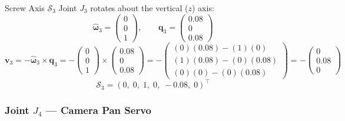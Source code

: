 \documentclass[12pt,a4paper]{article}
\newcommand{\vect}[1]{\bm{#1}}
\begin{document}
\begin{mathbox}{Screw Axis $\mathcal{S}_3$}
Joint $J_3$ rotates about the vertical ($z$) axis:
\[
  \vect{\hat\omega}_3 = \begin{pmatrix}0\\0\\1\end{pmatrix}, \qquad
  \vect{q}_3 = \begin{pmatrix}0.08\\0\\0.08\end{pmatrix}
\]
\[
  \vect{v}_3
  = -\vect{\hat\omega}_3 \times \vect{q}_3
  = -\begin{pmatrix}0\\0\\1\end{pmatrix} \times \begin{pmatrix}0.08\\0\\0.08\end{pmatrix}
  = -\begin{pmatrix}(0)(0.08)-(1)(0)\\(1)(0.08)-(0)(0.08)\\(0)(0)-(0)(0.08)\end{pmatrix}
  = -\begin{pmatrix}0\\0.08\\0\end{pmatrix}
\]
\[
  \boxed{\mathcal{S}_3 = (0,\;0,\;1,\;0,\;-0.08,\;0)^\top}
\]
\end{mathbox}

\subsubsection{Joint $J_4$ --- Camera Pan Servo}
\end{document}
